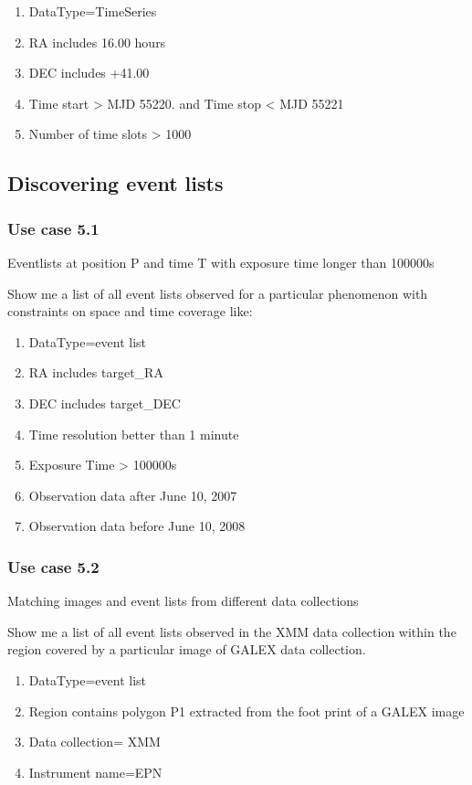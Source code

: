 \documentclass[11pt,a4paper]{ivoa}
\begin{document}
\begin{enumerate}
\item DataType=TimeSeries
\item RA includes 16.00 hours
\item DEC includes +41.00
\item Time start {\textgreater} MJD 55220. and Time stop {\textless} MJD 55221
\item Number of time slots {\textgreater} 1000
\end{enumerate}
\subsection{Discovering event lists}
\subsubsection{Use case 5.1}
Eventlists at position P and time T with exposure time longer than 100000s

Show me a list of all event lists observed for a particular phenomenon with constraints on space and time coverage like:

\begin{enumerate}
\item DataType=event list
\item RA includes target\_RA
\item DEC includes target\_DEC
\item Time resolution better than 1 minute
\item Exposure Time {\textgreater} 100000s
\item Observation data after June 10, 2007
\item Observation data before June 10, 2008
\end{enumerate}
\subsubsection{Use case 5.2}
Matching images and event lists from different data collections 

Show me a list of all event lists observed in the XMM data collection within the region covered by a particular image of
GALEX data collection.

\begin{enumerate}
\item DataType=event list
\item Region contains polygon P1 extracted from the foot print of a GALEX image 
\item Data collection= XMM
\item Instrument name=EPN
\end{enumerate}
\end{document}
